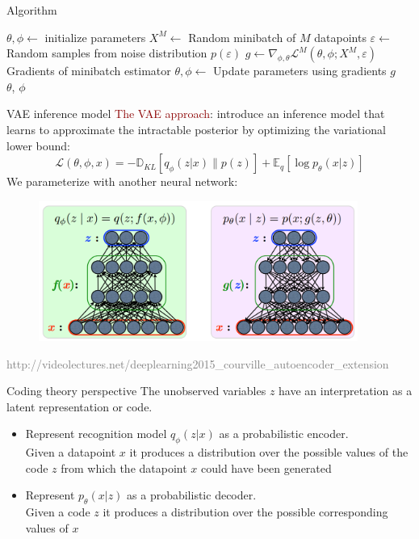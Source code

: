\documentclass[unicode,11pt]{beamer}
\begin{document}
\begin{frame}[fragile]{Algorithm}
  \begin{algorithmic}
    \State $\theta, \phi \gets$ initialize parameters
    \Repeat
       \State $X^M \gets$ Random minibatch of $M$ datapoints
       \State $\varepsilon \gets$ Random samples from noise distribution $p(\varepsilon)$
       \State $g \gets \nabla_{\phi, \theta} \mathcal{L}^M(\theta, \phi; X^M, \varepsilon) $ Gradients of minibatch estimator
       \State $\theta, \phi \gets$ Update parameters using gradients $g$
    \\
    \Return $\theta$, $\phi$
  \end{algorithmic}

\end{frame}

\begin{frame}[fragile]{VAE inference model}
  \textcolor{darkred}{The VAE approach}: introduce an inference model that
  learns to approximate the intractable posterior by optimizing the variational lower bound:
  $$ \mathcal{L}(\theta, \phi, x) = -\mathbb{D}_{KL}[q_{\phi} (z|x) \parallel p(z)] +
  \mathbb{E}_q [\log p_\theta (x|z)] $$
  We parameterize with another neural network:
  \begin{figure}[htbp]
    \includegraphics[height=130pt, keepaspectratio = true]{images/vae}
  \end{figure}
  \tiny \textcolor{gray}{http://videolectures.net/deeplearning2015\_courville\_autoencoder\_extension}
\end{frame}

\begin{frame}[fragile]{Coding theory perspective}
  The unobserved variables $z$ have an interpretation as a latent representation or code.

  \begin{itemize}
    \item Represent recognition model $q_{\phi}(z|x)$ as a probabilistic encoder.\\
        Given a datapoint $x$ it produces a distribution over the possible values of the code $z$
        from which the datapoint $x$ could have been generated
    \item Represent $p_{\theta}(x|z)$ as a probabilistic decoder.\\
        Given a code $z$ it produces a distribution over the possible corresponding values of $x$
  \end{itemize}
\end{frame}
\end{document}
